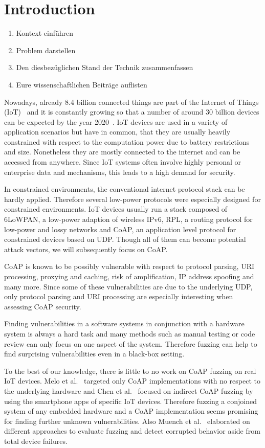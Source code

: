 \section{Introduction}
\label{section:introduction}

\begin{enumerate}
	\item Kontext einführen
	\item Problem darstellen
	\item Den diesbezüglichen Stand der Technik zusammenfassen
	\item Eure wissenschaftlichen Beiträge auflisten
\end{enumerate}

Nowadays, already 8.4 billion connected things are part of the Internet of Things (IoT)~\cite{IoTForecastGartner} and it is constantly growing so that a number of around 30 billion devices can be expected by the year 2020~\cite{IoTForecastNordrum}. IoT devices are used in a variety of application scenarios but have in common, that they are usually heavily constrained with respect to the computation power due to battery restrictions and size. Nonetheless they are mostly connected to the internet and can be accessed from anywhere. Since IoT systems often involve highly personal or enterprise data and mechanisms, this leads to a high demand for security. 

In constrained environments, the conventional internet protocol stack can be hardly applied. Therefore several low-power protocols were especially designed for constrained environments. IoT devices usually run a stack composed of 6LoWPAN, a low-power adaption of wireless IPv6, RPL, a routing protocol for low-power and lossy networks and CoAP, an application level protocol for constrained devices based on UDP. Though all of them can become potential attack vectors, we will subsequently focus on CoAP.

CoAP is known to be possibly vulnerable with respect to protocol parsing, URI processing, proxying and caching, risk of amplification, IP address spoofing and many more. Since some of these vulnerabilities are due to the underlying UDP, only protocol parsing and URI processing are especially interesting when assessing CoAP security.

Finding vulnerabilities in a software systems in conjunction with a hardware system is always a hard task and many methods such as manual testing or code review can only focus on one aspect of the system. Therefore fuzzing can help to find surprising vulnerabilities even in a black-box setting.


To the best of our knowledge, there is little to no work on CoAP fuzzing on real IoT devices. Melo et al.~\cite{Melo2017RobustnessTO} targeted only CoAP implementations with no respect to the underlying hardware and Chen et al.~\cite{chen2018ndss} focused on indirect CoAP fuzzing by using the smartphone apps of specific IoT devices. Therefore fuzzing a conjoined system of any embedded hardware and a CoAP implementation seems promising for finding further unknown vulnerabilities. Also Muench et al.~\cite{EURECOM+5417} elaborated on different approaches to evaluate fuzzing and detect corrupted behavior aside from total device failures.
